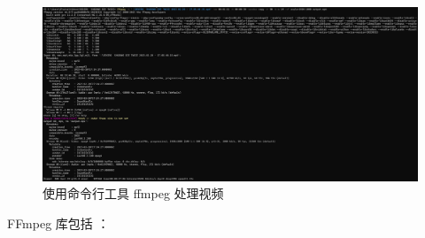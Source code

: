 \begin{figure}[h]
    \centering
    \includegraphics[width=\textwidth]{figures/ffmpeg.png}
    \caption{使用命令行工具 ffmpeg 处理视频}
    \label{fig:ffmpeg}
\end{figure}

FFmpeg 库包括 \cite{ffmpeg_doc}：

